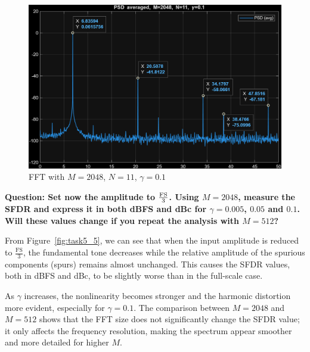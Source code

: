 \begin{figure}[H]
    \centering
    \includegraphics[width=1\textwidth]{img/task5_y_0_1.png}
    \caption{FFT with $M=2048$, $N=11$, $\gamma=0.1$}
    \label{fig:task5_y_0_1}
\end{figure}

\vspace{1cm}
\textbf{Question: Set now the amplitude to $\frac{\rm FS}{3}$. Using $M=2048$, measure the SFDR and express it in both dBFS and dBc for $\gamma=0.005$, $0.05$ and $0.1$. Will these values change if you repeat the analysis with $M=512$?
}
\vspace{0.5cm}

From Figure~\ref{fig:task5_5}, we can see that when the input amplitude is reduced to $\frac{\mathrm{FS}}{3}$, the fundamental tone decreases while the relative amplitude of the spurious components (spurs) remains almost unchanged.
This causes the SFDR values, both in dBFS and dBc, to be slightly worse than in the full-scale case.

As $\gamma$ increases, the nonlinearity becomes stronger and the harmonic distortion more evident, especially for $\gamma = 0.1$.
The comparison between $M = 2048$ and $M = 512$ shows that the FFT size does not significantly change the SFDR value; it only affects the frequency resolution, making the spectrum appear smoother and more detailed for higher $M$.

